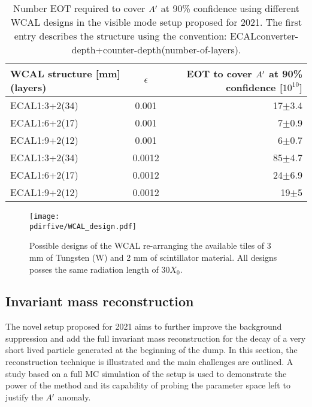 \begin{center}
\begin{table}[tbh!]
\begin{tabular}{lcr}
  WCAL structure [mm](layers)  & $\epsilon$  & EOT to cover $A'$ at 90\% confidence [$10^{10}$] \\
  \hline
  ECAL1:3+2(34)                & 0.001   & 17$\pm$3.4                                            \\ 
  ECAL1:6+2(17)                & 0.001   & 7$\pm$0.9                                             \\
  ECAL1:9+2(12)                & 0.001   & 6$\pm$0.7                                             \\
  ECAL1:3+2(34)                & 0.0012  & 85$\pm$4.7                                            \\
  ECAL1:6+2(17)                & 0.0012  & 24$\pm$6.9                                            \\  
  ECAL1:9+2(12)                & 0.0012  & 19$\pm$5                                              \\  
  \hline
\end{tabular}
\label{tab:wcal-length-results}
\caption[Possible WCAL design and with their possible experimental reach]{Number EOT required to cover $A'$ at 90\% confidence using different WCAL designs in the visible mode setup proposed for 2021. The first entry describes the structure using the convention:
  ECALconverter-depth+counter-depth(number-of-layers).}
\end{table}
\end{center}

\begin{figure}[tbh!]
  \centering
  \texttt{[image: \\pdirfive/WCAL\_design.pdf]}
  \caption[New WCAL design for 2021]{Possible designs of the WCAL re-arranging the available tiles of 3 mm of Tungsten (W) and 2 mm of scintillator material. All designs posses the same radiation length of 30$X_0$.}
  \label{fig:wcal-design}
\end{figure}

\subsection{Invariant mass reconstruction}
\label{ch5:sec:new-vismode-setup-invmass}

The novel setup proposed for 2021 aims to further improve the background suppression and add the full invariant mass reconstruction for the decay of a very short lived particle generated at the beginning of the dump. In this section, the reconstruction technique is illustrated and the main challenges are outlined. A study based on a full MC simulation of the setup is used to demonstrate the power of the method and its capability of probing the parameter space left to justify the $A'$ anomaly.

